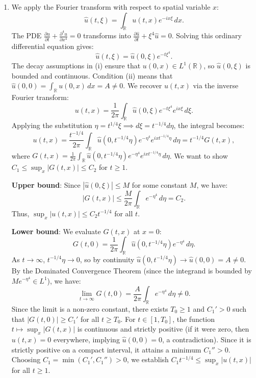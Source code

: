\documentclass{article}
\begin{document}
\begin{enumerate}[label=\fbox{\arabic*}]
  \item %
        We apply the Fourier transform with respect to spatial variable $x$:
        \[
          \hat{u}(t, \xi) = \int_{\mathbb{R}} u(t, x) e^{-ix\xi} \, dx.
        \]
        The PDE $\frac{\partial u}{\partial t} + \frac{\partial^4 u}{\partial x^4} = 0$ transforms into $\frac{\partial \hat{u}}{\partial t} + \xi^4 \hat{u} = 0$.
        Solving this ordinary differential equation gives:
        \[
          \hat{u}(t, \xi) = \hat{u}(0, \xi) e^{-t \xi^4}.
        \]
        The decay assumptions in (i) ensure that $u(0, x) \in L^1(\mathbb{R})$, so $\hat{u}(0, \xi)$ is bounded and continuous. Condition (ii) means that $\hat{u}(0, 0) = \int_{\mathbb{R}} u(0, x) \, dx = A \neq 0$.
        We recover $u(t, x)$ via the inverse Fourier transform:
        \[
          u(t, x) = \frac{1}{2\pi} \int_{\mathbb{R}} \hat{u}(0, \xi) e^{-t \xi^4} e^{ix\xi} \, d\xi.
        \]
        Applying the substitution $\eta = t^{1/4} \xi \implies d\xi = t^{-1/4} d\eta$, the integral becomes:
        \[
          u(t, x) = \frac{t^{-1/4}}{2\pi} \int_{\mathbb{R}} \hat{u}(0, t^{-1/4} \eta) e^{-\eta^4} e^{ix t^{-1/4} \eta} \, d\eta = t^{-1/4} G(t, x),
        \]
        where $G(t, x) = \frac{1}{2\pi} \int_{\mathbb{R}} \hat{u}(0, t^{-1/4} \eta) e^{-\eta^4} e^{ix t^{-1/4} \eta} \, d\eta$. We want to show $C_1 \le \sup_x |G(t, x)| \le C_2$ for $t \ge 1$.
        
        \textbf{Upper bound}: Since $|\hat{u}(0, \xi)| \le M$ for some constant $M$, we have:
        \[
          |G(t, x)| \le \frac{M}{2\pi} \int_{\mathbb{R}} e^{-\eta^4} \, d\eta = C_2.
        \]
        Thus, $\sup_x |u(t, x)| \le C_2 t^{-1/4}$ for all $t$.
        
        \textbf{Lower bound}: We evaluate $G(t, x)$ at $x = 0$:
        \[
          G(t, 0) = \frac{1}{2\pi} \int_{\mathbb{R}} \hat{u}(0, t^{-1/4} \eta) e^{-\eta^4} \, d\eta.
        \]
        As $t \to \infty$, $t^{-1/4} \eta \to 0$, so by continuity $\hat{u}(0, t^{-1/4} \eta) \to \hat{u}(0, 0) = A \neq 0$.
        By the Dominated Convergence Theorem (since the integrand is bounded by $M e^{-\eta^4} \in L^1$), we have:
        \[
          \lim_{t \to \infty} G(t, 0) = \frac{A}{2\pi} \int_{\mathbb{R}} e^{-\eta^4} \, d\eta \neq 0.
        \]
        Since the limit is a non-zero constant, there exists $T_0 \ge 1$ and $C_1' > 0$ such that $|G(t, 0)| \ge C_1'$ for all $t \ge T_0$.
        For $t \in [1, T_0]$, the function $t \mapsto \sup_x |G(t, x)|$ is continuous and strictly positive (if it were zero, then $u(t, x) = 0$ everywhere, implying $\hat{u}(0, 0) = 0$, a contradiction).
        Since it is strictly positive on a compact interval, it attains a minimum $C_1'' > 0$.
        Choosing $C_1 = \min(C_1', C_1'') > 0$, we establish $C_1 t^{-1/4} \le \sup_x |u(t, x)|$ for all $t \ge 1$.


\end{enumerate}
\end{document}
